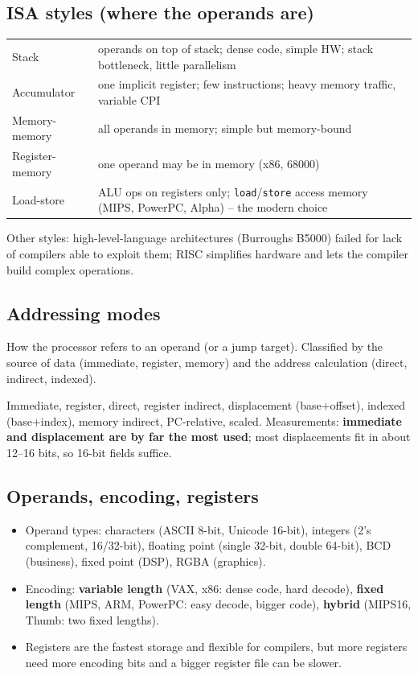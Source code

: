 \documentclass[11pt]{article}
\begin{document}
\subsection{ISA styles (where the operands are)}
\begin{center}
\small
\begin{tabular}{@{}lp{10cm}@{}}
\toprule
Stack & operands on top of stack; dense code, simple HW; stack bottleneck, little parallelism \\
Accumulator & one implicit register; few instructions; heavy memory traffic, variable CPI \\
Memory-memory & all operands in memory; simple but memory-bound \\
Register-memory & one operand may be in memory (x86, 68000) \\
Load-store & ALU ops on registers only; \texttt{load}/\texttt{store} access memory (MIPS, PowerPC, Alpha) -- the modern choice \\
\bottomrule
\end{tabular}
\end{center}
Other styles: high-level-language architectures (Burroughs B5000) failed for
lack of compilers able to exploit them; RISC simplifies hardware and lets the
compiler build complex operations.

\subsection{Addressing modes}
\begin{definition}
How the processor refers to an operand (or a jump target). Classified by the
source of data (immediate, register, memory) and the address calculation
(direct, indirect, indexed).
\end{definition}
Immediate, register, direct, register indirect, displacement
(base+offset), indexed (base+index), memory indirect, PC-relative, scaled.
Measurements: \textbf{immediate and displacement are by far the most used};
most displacements fit in about 12--16 bits, so 16-bit fields suffice.

\subsection{Operands, encoding, registers}
\begin{itemize}[leftmargin=*]
  \item Operand types: characters (ASCII 8-bit, Unicode 16-bit), integers
  (2's complement, 16/32-bit), floating point (single 32-bit, double
  64-bit), BCD (business), fixed point (DSP), RGBA (graphics).
  \item Encoding: \textbf{variable length} (VAX, x86: dense code, hard
  decode), \textbf{fixed length} (MIPS, ARM, PowerPC: easy decode, bigger
  code), \textbf{hybrid} (MIPS16, Thumb: two fixed lengths).
  \item Registers are the fastest storage and flexible for compilers, but
  more registers need more encoding bits and a bigger register file can be
  slower.
\end{itemize}
\end{document}
